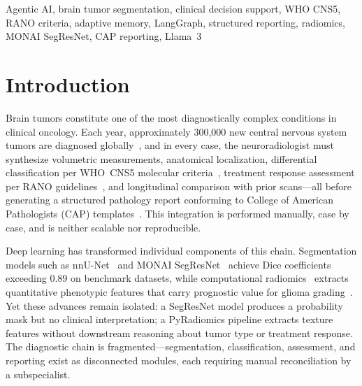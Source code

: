 \documentclass[journal]{IEEEtran}
\begin{document}
\begin{abstract}
To our knowledge, NeuroAgent is the first system to encode WHO~CNS5,
RANO, and CAP protocols as deterministic agent logic within a unified
MRI-to-report pipeline, providing an open, reproducible scaffold for
future clinically validated neuro-oncology AI.
\end{abstract}

\begin{IEEEkeywords}
Agentic AI, brain tumor segmentation, clinical decision support, WHO
CNS5, RANO criteria, adaptive memory, LangGraph, structured reporting,
radiomics, MONAI SegResNet, CAP reporting, Llama~3
\end{IEEEkeywords}

\section{Introduction}

Brain tumors constitute one of the most diagnostically complex conditions
in clinical oncology. Each year, approximately 300{,}000 new central
nervous system tumors are diagnosed globally~\cite{ostrom2021}, and in
every case, the neuroradiologist must synthesize volumetric measurements,
anatomical localization, differential classification per WHO~CNS5 molecular
criteria~\cite{louis2021}, treatment response assessment per RANO
guidelines~\cite{wen2010}, and longitudinal comparison with prior
scans---all before generating a structured pathology report conforming to
College of American Pathologists (CAP) templates~\cite{cap2024}. This
integration is performed manually, case by case, and is neither scalable
nor reproducible.

Deep learning has transformed individual components of this chain.
Segmentation models such as nnU-Net~\cite{isensee2021} and MONAI
SegResNet~\cite{monai2023} achieve Dice coefficients exceeding 0.89 on
benchmark datasets, while computational radiomics~\cite{vangriethuysen2017}
extracts quantitative phenotypic features that carry prognostic value for
glioma grading~\cite{kickingereder2016}. Yet these advances remain
isolated: a SegResNet model produces a probability mask but no clinical
interpretation; a PyRadiomics pipeline extracts texture features without
downstream reasoning about tumor type or treatment response. The diagnostic
chain is fragmented---segmentation, classification, assessment, and
reporting exist as disconnected modules, each requiring manual
reconciliation by a subspecialist.
\end{document}
